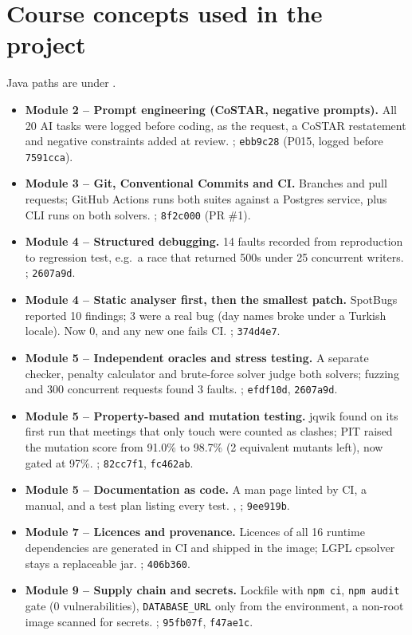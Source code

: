 \documentclass[11pt,a4paper]{article}
\begin{document}
\section{Course concepts used in the project}

Java paths are under .
\begin{itemize}[leftmargin=*,nosep]
  \item \textbf{Module 2 -- Prompt engineering (CoSTAR, negative prompts).}
        All 20 AI tasks were logged before coding, as the request, a CoSTAR restatement and negative constraints added at review.
        ; \texttt{ebb9c28} (P015, logged before \texttt{7591cca}).
  \item \textbf{Module 3 -- Git, Conventional Commits and CI.}
        Branches and pull requests; GitHub Actions runs both suites against a Postgres service, plus CLI runs on both solvers.
        ; \texttt{8f2c000} (PR \#1).
  \item \textbf{Module 4 -- Structured debugging.}
        14 faults recorded from reproduction to regression test, e.g.\ a race that returned 500s under 25 concurrent writers.
        ; \texttt{2607a9d}.
  \item \textbf{Module 4 -- Static analyser first, then the smallest patch.}
        SpotBugs reported 10 findings; 3 were a real bug (day names broke under a Turkish locale). Now 0, and any new one fails CI.
        ; \texttt{374d4e7}.
  \item \textbf{Module 5 -- Independent oracles and stress testing.}
        A separate checker, penalty calculator and brute-force solver judge both solvers; fuzzing and 300 concurrent requests found 3 faults.
        ; \texttt{efdf10d}, \texttt{2607a9d}.
  \item \textbf{Module 5 -- Property-based and mutation testing.}
        jqwik found on its first run that meetings that only touch were counted as clashes; PIT raised the mutation score from 91.0\% to 98.7\% (2 equivalent mutants left), now gated at 97\%.
        ; \texttt{82cc7f1}, \texttt{fc462ab}.
  \item \textbf{Module 5 -- Documentation as code.}
        A man page linted by CI, a manual, and a test plan listing every test.
        , ; \texttt{9ee919b}.
  \item \textbf{Module 7 -- Licences and provenance.}
        Licences of all 16 runtime dependencies are generated in CI and shipped in the image; LGPL cpsolver stays a replaceable jar.
        ; \texttt{406b360}.
  \item \textbf{Module 9 -- Supply chain and secrets.}
        Lockfile with \texttt{npm ci}, \texttt{npm audit} gate (0 vulnerabilities), \texttt{DATABASE\_URL} only from the environment, a non-root image scanned for secrets.
        ; \texttt{95fb07f}, \texttt{f47ae1c}.
\end{itemize}
\end{document}
